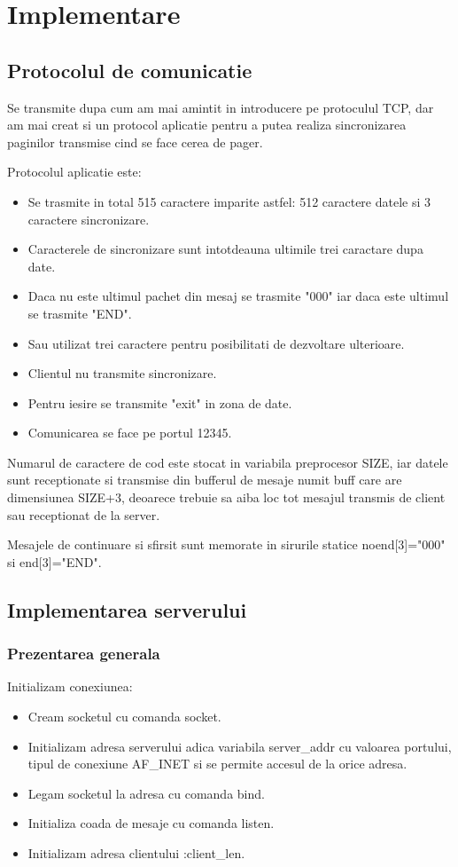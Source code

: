 \chapter{Implementare}
\section{Protocolul de comunicatie}

\hspace{5mm}Se transmite dupa cum am mai amintit in introducere pe
protoculul TCP, dar am mai creat si un protocol aplicatie pentru a putea
realiza sincronizarea paginilor transmise cind se face cerea de pager.

Protocolul aplicatie este:
\begin{itemize}
\item Se trasmite in total 515 caractere imparite astfel: 512 caractere
datele si 3 caractere sincronizare.
\item Caracterele de sincronizare sunt intotdeauna ultimile trei caractare
dupa date.
\item Daca nu este ultimul pachet din mesaj se trasmite "000" iar daca este
ultimul se trasmite "END".
\item Sau utilizat trei caractere pentru posibilitati de dezvoltare
ulterioare.
\item Clientul nu transmite sincronizare.
\item Pentru iesire se transmite "exit" in zona de date.
\item Comunicarea se face pe portul 12345.
\end{itemize}

Numarul de caractere de cod este stocat in variabila preprocesor SIZE, iar
datele sunt receptionate si transmise din bufferul de mesaje numit buff
care are dimensiunea SIZE+3, deoarece trebuie sa aiba loc tot mesajul
transmis de client sau receptionat de la server.

Mesajele de continuare si sfirsit sunt memorate in sirurile statice
noend[3]="000" si end[3]="END".

\section{Implementarea serverului}

\subsection{Prezentarea generala}
\hspace{5mm}Initializam conexiunea:
\begin{itemize}
\item Cream socketul cu comanda socket.
\item Initializam adresa serverului adica variabila server\_addr cu valoarea
portului, tipul de conexiune AF\_INET si se permite accesul de la orice
adresa.
\item Legam socketul la adresa cu comanda bind.
\item Initializa coada de mesaje cu comanda listen.
\item Initializam adresa clientului :client\_len.
\end{itemize}


